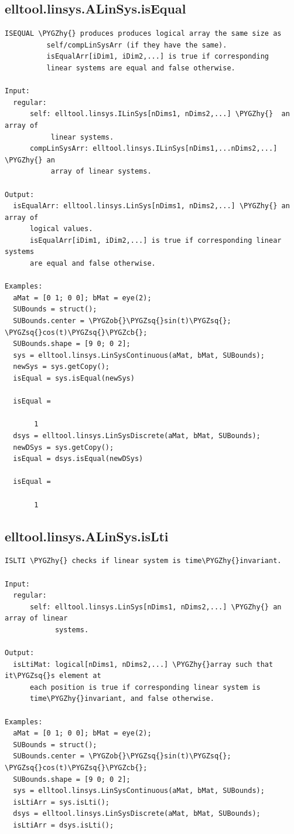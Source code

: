 \documentclass[letterpaper,10pt,english]{sphinxmanual}
\def\PYGZob{\char`\{}
\def\PYGZcb{\char`\}}
\def\PYGZhy{\char`\-}
\def\PYGZsq{\char`\'}
\begin{document}
\subsection{elltool.linsys.ALinSys.isEqual}
\label{chap_functions:elltool-linsys-alinsys-isequal}
\begin{Verbatim}[commandchars=\\\{\}]
ISEQUAL \PYGZhy{} produces produces logical array the same size as
          self/compLinSysArr (if they have the same).
          isEqualArr[iDim1, iDim2,...] is true if corresponding
          linear systems are equal and false otherwise.

Input:
  regular:
      self: elltool.linsys.ILinSys[nDims1, nDims2,...] \PYGZhy{}  an array of
           linear systems.
      compLinSysArr: elltool.linsys.ILinSys[nDims1,...nDims2,...] \PYGZhy{} an
           array of linear systems.

Output:
  isEqualArr: elltool.linsys.LinSys[nDims1, nDims2,...] \PYGZhy{} an array of
      logical values.
      isEqualArr[iDim1, iDim2,...] is true if corresponding linear systems
      are equal and false otherwise.

Examples:
  aMat = [0 1; 0 0]; bMat = eye(2);
  SUBounds = struct();
  SUBounds.center = \PYGZob{}\PYGZsq{}sin(t)\PYGZsq{}; \PYGZsq{}cos(t)\PYGZsq{}\PYGZcb{};
  SUBounds.shape = [9 0; 0 2];
  sys = elltool.linsys.LinSysContinuous(aMat, bMat, SUBounds);
  newSys = sys.getCopy();
  isEqual = sys.isEqual(newSys)

  isEqual =

       1
  dsys = elltool.linsys.LinSysDiscrete(aMat, bMat, SUBounds);
  newDSys = sys.getCopy();
  isEqual = dsys.isEqual(newDSys)

  isEqual =

       1
\end{Verbatim}


\subsection{elltool.linsys.ALinSys.isLti}
\label{chap_functions:elltool-linsys-alinsys-islti}
\begin{Verbatim}[commandchars=\\\{\}]
ISLTI \PYGZhy{} checks if linear system is time\PYGZhy{}invariant.

Input:
  regular:
      self: elltool.linsys.LinSys[nDims1, nDims2,...] \PYGZhy{} an array of linear
            systems.

Output:
  isLtiMat: logical[nDims1, nDims2,...] \PYGZhy{}array such that it\PYGZsq{}s element at
      each position is true if corresponding linear system is
      time\PYGZhy{}invariant, and false otherwise.

Examples:
  aMat = [0 1; 0 0]; bMat = eye(2);
  SUBounds = struct();
  SUBounds.center = \PYGZob{}\PYGZsq{}sin(t)\PYGZsq{}; \PYGZsq{}cos(t)\PYGZsq{}\PYGZcb{};
  SUBounds.shape = [9 0; 0 2];
  sys = elltool.linsys.LinSysContinuous(aMat, bMat, SUBounds);
  isLtiArr = sys.isLti();
  dsys = elltool.linsys.LinSysDiscrete(aMat, bMat, SUBounds);
  isLtiArr = dsys.isLti();
\end{Verbatim}
\end{document}
